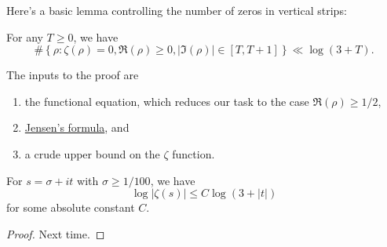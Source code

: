 \documentclass[reqno]{amsart}  \numberwithin{theorem}{section} \numberwithin{equation}{section}
\begin{document}
Here's a basic lemma controlling the number of zeros in vertical strips:
\begin{lemma}
  For any $T \geq 0$, we have
  \begin{equation*}
    \# \left\{ \rho : \zeta(\rho) = 0, \Re(\rho) \geq 0, \lvert \Im(\rho) \rvert \in [T, T + 1] \right\}
    \ll \log (3 + T).
  \end{equation*}
\end{lemma}
The inputs to the proof are
\begin{enumerate}
\item the functional equation, which reduces our task to the case $\Re(\rho) \geq 1/2$,
\item \href{https://en.wikipedia.org/wiki/Jensen\%27s_formula}{Jensen's formula}, and
\item a crude upper bound on the $\zeta$ function.
\end{enumerate}
\begin{lemma}
  For $s = \sigma + it $ with $\sigma \geq 1/100$, we have
  \begin{equation*}
\log \lvert \zeta(s) \rvert \leq C \log (3 + \lvert t \rvert)
  \end{equation*}
  for some absolute constant $C$.
\end{lemma}
\begin{proof}
Next time.
\end{proof}


{} 
\end{document}
